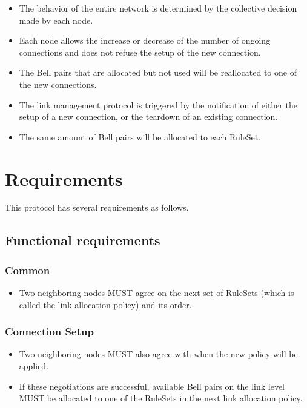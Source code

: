 \begin{itemize}
  \item The behavior of the entire network is determined by the collective decision made by each node.
  \item Each node allows the increase or decrease of the number of ongoing connections and does not refuse the setup of the new connection.
  \item The Bell pairs that are allocated but not used will be reallocated to one of the new connections.
  \item The link management protocol is triggered by the notification of either the setup of a new connection, or the teardown of an existing connection.
  \item The same amount of Bell pairs will be allocated to each RuleSet.
\end{itemize}

\section{Requirements}

This protocol has several requirements as follows.

\subsection{Functional requirements}

\subsubsection{Common}

\begin{itemize}
  \item Two neighboring nodes MUST agree on the next set of RuleSets (which is called the link allocation policy) and its order.
\end{itemize}

\subsubsection{Connection Setup}

\begin{itemize}
  \item Two neighboring nodes MUST also agree with when the new policy will be applied.
  \item If these negotiations are successful, available Bell pairs on the link level MUST be allocated to one of the RuleSets in the next link allocation policy.
\end{itemize}

